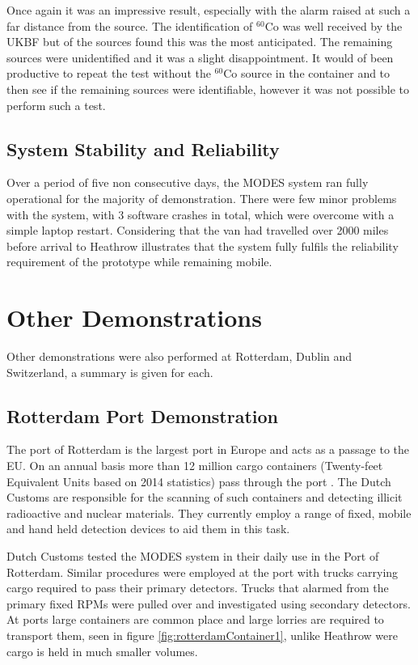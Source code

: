 Once again it was an impressive result, especially with the alarm raised at such a far distance from the source. The identification of $^{60}$Co was well received by the UKBF but of the sources found this was the most anticipated. The remaining sources were unidentified and it was a slight disappointment. It would of been productive to repeat the test without the $^{60}$Co source in the container and to then see if the remaining sources were identifiable, however it was not possible to perform such a test.

\subsection{System Stability and Reliability}
Over a period of five non consecutive days, the MODES system ran fully operational for the majority of demonstration. There were few minor problems with the system, with 3 software crashes in total, which were overcome with a simple laptop restart. Considering that the van had travelled over 2000 miles before arrival to Heathrow illustrates that the system fully fulfils the reliability requirement of the prototype while remaining mobile. 

\section{Other Demonstrations}
Other demonstrations were also performed at Rotterdam, Dublin and Switzerland, a summary is given for each.

\subsection{Rotterdam Port Demonstration}
The port of Rotterdam is the largest port in Europe and acts as a passage to the EU. On an annual basis more than 12 million cargo containers (Twenty-feet Equivalent Units based on 2014 statistics) pass through the port \cite{rotterdamStats}. The Dutch Customs are responsible for the scanning of such containers and detecting illicit radioactive and nuclear materials. They currently employ a range of fixed, mobile and hand held detection devices to aid them in this task.

Dutch Customs tested the MODES system in their daily use in the Port of Rotterdam. Similar procedures were employed at the port with trucks carrying cargo required to pass their primary detectors. Trucks that alarmed from the primary fixed RPMs were pulled over and investigated using secondary detectors. At ports large containers are common place and large lorries are required to transport them, seen in figure \ref{fig:rotterdamContainer1}, unlike Heathrow were cargo is held in much smaller volumes.

